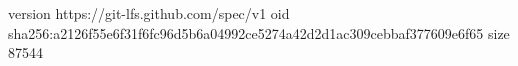 version https://git-lfs.github.com/spec/v1
oid sha256:a2126f55e6f31f6fc96d5b6a04992ce5274a42d2d1ac309cebbaf377609e6f65
size 87544
